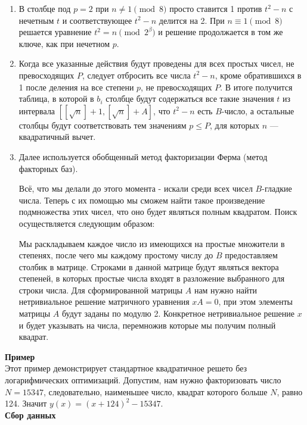 \documentclass[12pt,a4paper]{scrartcl}
\begin{document}
\begin{enumerate}
	\item В столбце под $p=2$ при $n\neq 1{\pmod {8}}$ просто ставится 1 против $t^{2}-n$ с нечетным $t$ и соответствующее $t^{2}-n$ делится на 2. При $n\equiv 1{\pmod {8}}$ решается уравнение $t^{2}=n{\pmod {2^{\beta }}}$ и решение продолжается в том же ключе, как при нечетном $p$.
	
	\item Когда все указанные действия будут проведены для всех простых чисел, не превосходящих $P$, следует отбросить все числа $t^{2}-n$, кроме обратившихся в 1 после деления на все степени $p$, не превосходящих $P$. В итоге получится таблица, в которой в $b_{i}$ столбце будут содержаться все такие значения $t$ из интервала $\left[{\left[{\sqrt {n}}\right]+1,\left[{\sqrt {n}}\right]+A}\right]$, что $t^{2}-n$ есть $B$-число, а остальные столбцы будут соответствовать тем значениям $p\leq P$, для которых $n$ — квадратичный вычет.
	
	\item Далее используется обобщенный метод факторизации Ферма (метод факторных баз).
	
	Всё, что мы делали до этого момента - искали среди всех чисел $B$-гладкие числа. Теперь с их помощью мы сможем найти такое произведение подмножества этих чисел, что оно будет являться полным квадратом. Поиск осуществляется следующим образом:
	
	Мы раскладываем каждое число из имеющихся на простые множители в степенях, после чего мы каждому простому числу до $B$ предоставляем столбик в матрице. Строками в данной матрице будут являться вектора степеней, в которых простые числа входят в разложение выбранного для строки числа. Для сформированной матрицы $A$ нам нужно найти нетривиальное решение матричного уравнения $xA = 0$, при этом элементы матрицы $A$ будут заданы по модулю 2. Конкретное нетривиальное решение $x$ и будет указывать на числа, перемножив которые мы получим полный квадрат.
	
\end{enumerate}

\textbf{Пример}\\

Этот пример демонстрирует стандартное квадратичное решето без логарифмических оптимизаций. Допустим, нам нужно факторизовать число $N = 15347$, следовательно, наименьшее число, квадрат которого больше $N$, равно 124. Значит $y(x) = (x + 124)^2 - 15347$.\\

\textbf{Сбор данных}\\
\end{document}

